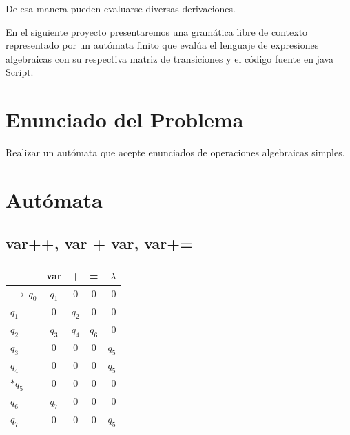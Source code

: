 \documentclass[a4paper, 11pt]{article}
\begin{document}
De esa manera pueden evaluarse diversas derivaciones. 

En el siguiente proyecto presentaremos una gramática libre de contexto representado por un autómata finito que evalúa el lenguaje de expresiones algebraicas con su respectiva matriz de transiciones y el código fuente en java Script. 

\section*{Enunciado del Problema}
Realizar un autómata que acepte enunciados de operaciones algebraicas simples.

\section*{Autómata}

\subsection*{var++, var + var, var+=} %



\begin{center}
  \begin{tabular}{ | l || c | c | c | r | }
    \hline
     & var & + & = & $\lambda$ \\ \hline \hline
    $\,\to\, q_0$ & $q_1$ & 0 & 0 & 0 \\ \hline
    $q_1$ & 0 & $q_2$ & 0 & 0 \\ \hline
    $q_2$ & $q_3$ & $q_4$ & $q_6$ & 0 \\ \hline
    $q_3$ & 0 & 0 & 0 & $q_5$ \\ \hline
    $q_4$ & 0 & 0 & 0 & $q_5$ \\ \hline
    $* q_5$ & 0 & 0 & 0 & 0 \\ \hline
    $q_6$ & $q_7$ & 0 & 0 & 0 \\ \hline
    $q_7$ & 0 & 0 & 0 & $q_5$ \\ \hline
  \end{tabular}
\end{center}
\end{document}
